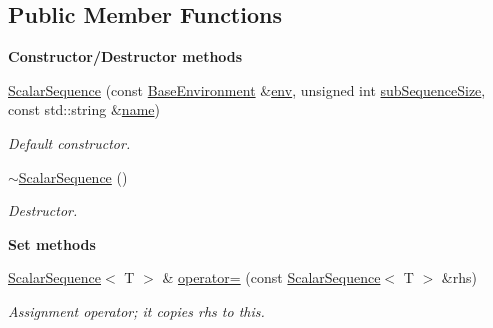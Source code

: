 \subsection*{Public Member Functions}
\begin{Indent}{\bf Constructor/\-Destructor methods}\par
\begin{DoxyCompactItemize}
\item 
\hyperlink{class_q_u_e_s_o_1_1_scalar_sequence_af7084e62a902ffefc8a49e317ac45e7c}{Scalar\-Sequence} (const \hyperlink{class_q_u_e_s_o_1_1_base_environment}{Base\-Environment} \&\hyperlink{class_q_u_e_s_o_1_1_scalar_sequence_a78095426a715b7a735919044927f49fe}{env}, unsigned int \hyperlink{class_q_u_e_s_o_1_1_scalar_sequence_a0288ea295eedc216a1617b3286f6f3a0}{sub\-Sequence\-Size}, const std\-::string \&\hyperlink{class_q_u_e_s_o_1_1_scalar_sequence_ad3e65b63cff35a52d5d78bf9ae6bfa8d}{name})
\begin{DoxyCompactList}\small\item\em Default constructor. \end{DoxyCompactList}\item 
\hyperlink{class_q_u_e_s_o_1_1_scalar_sequence_a533bf74759fe60daffa8ee97a5cd6692}{$\sim$\-Scalar\-Sequence} ()
\begin{DoxyCompactList}\small\item\em Destructor. \end{DoxyCompactList}\end{DoxyCompactItemize}
\end{Indent}
\begin{Indent}{\bf Set methods}\par
\begin{DoxyCompactItemize}
\item 
\hyperlink{class_q_u_e_s_o_1_1_scalar_sequence}{Scalar\-Sequence}$<$ T $>$ \& \hyperlink{class_q_u_e_s_o_1_1_scalar_sequence_a373b449ab87369d1cabd380bcb73c052}{operator=} (const \hyperlink{class_q_u_e_s_o_1_1_scalar_sequence}{Scalar\-Sequence}$<$ T $>$ \&rhs)
\begin{DoxyCompactList}\small\item\em Assignment operator; it copies {\ttfamily rhs} to {\ttfamily this}. \end{DoxyCompactList}\end{DoxyCompactItemize}
\end{Indent}
